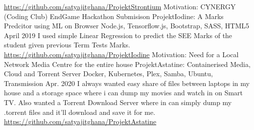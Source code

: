 \begin{cventries}
{        \url{https://github.com/satyajitghana/ProjektStrontium}
        }
    \cventry
        {Motivation: CYNERGY (Coding Club) EndGame Hackathon Submisison}
        {ProjektIodine: A Marks Predcitor using ML on Browser}
        {Node.js, Tensorflow.js, Bootstrap, SASS, HTML5}
        {April 2019}
        {
            I used simple Linear Regression to predict the SEE Marks of the student given previous Term Tests Marks.
            \url{https://github.com/satyajitghana/ProjektIodine}
        }
    \cventry
        {Motivation: Need for a Local Network Media Centre for the entire house}
        {ProjektAstatine: Containerised Media, Cloud and Torrent Server}
        {Docker, Kubernetes, Plex, Samba, Ubuntu, Transmission}
        {Apr. 2020}
        {
            I always wanted easy share of files between laptops in my house and a storage space where i can dump my movies and watch in on Smart TV.
            Also wanted a Torrent Download Server where in can simply dump my .torrent files and it'll download and save it for me.
            \url{https://github.com/satyajitghana/ProjektAstatine}
        }
\end{cventries}
